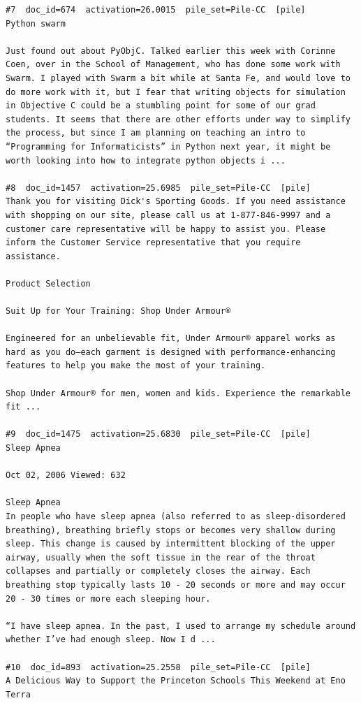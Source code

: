 \begin{verbatim}
#7  doc_id=674  activation=26.0015  pile_set=Pile-CC  [pile]
Python swarm

Just found out about PyObjC. Talked earlier this week with Corinne Coen, over in the School of Management, who has done some work with Swarm. I played with Swarm a bit while at Santa Fe, and would love to do more work with it, but I fear that writing objects for simulation in Objective C could be a stumbling point for some of our grad students. It seems that there are other efforts under way to simplify the process, but since I am planning on teaching an intro to “Programming for Informaticists” in Python next year, it might be worth looking into how to integrate python objects i ...

#8  doc_id=1457  activation=25.6985  pile_set=Pile-CC  [pile]
Thank you for visiting Dick's Sporting Goods. If you need assistance with shopping on our site, please call us at 1-877-846-9997 and a customer care representative will be happy to assist you. Please inform the Customer Service representative that you require assistance.

Product Selection

Suit Up for Your Training: Shop Under Armour®

Engineered for an unbelievable fit, Under Armour® apparel works as hard as you do—each garment is designed with performance-enhancing features to help you make the most of your training.

Shop Under Armour® for men, women and kids. Experience the remarkable fit ...

#9  doc_id=1475  activation=25.6830  pile_set=Pile-CC  [pile]
Sleep Apnea

Oct 02, 2006 Viewed: 632

Sleep Apnea
In people who have sleep apnea (also referred to as sleep-disordered breathing), breathing briefly stops or becomes very shallow during sleep. This change is caused by intermittent blocking of the upper airway, usually when the soft tissue in the rear of the throat collapses and partially or completely closes the airway. Each breathing stop typically lasts 10 - 20 seconds or more and may occur 20 - 30 times or more each sleeping hour.

“I have sleep apnea. In the past, I used to arrange my schedule around whether I’ve had enough sleep. Now I d ...

#10  doc_id=893  activation=25.2558  pile_set=Pile-CC  [pile]
A Delicious Way to Support the Princeton Schools This Weekend at Eno Terra


\end{verbatim}
